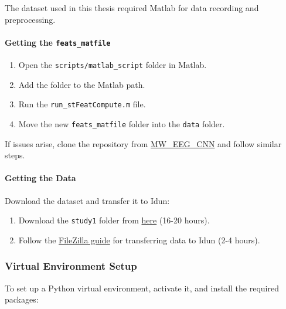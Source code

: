 The dataset used in this thesis required Matlab for data recording and preprocessing.

\paragraph{Getting the \texttt{feats\_matfile}}

\begin{enumerate}
    \item Open the \texttt{scripts/matlab\_script} folder in Matlab.
    \item Add the folder to the Matlab path.
    \item Run the \texttt{run\_stFeatCompute.m} file.
    \item Move the new \texttt{feats\_matfile} folder into the \texttt{data} folder.
\end{enumerate}

If issues arise, clone the repository from \href{https://github.com/christina109/MW_EEG_CNN.git}{MW\_EEG\_CNN} and follow similar steps.

\paragraph{Getting the Data}

Download the dataset and transfer it to Idun:

\begin{enumerate}
    \item Download the \texttt{study1} folder from \href{https://unishare.nl/index.php/s/T94LXPQqw5FEA4J?path=%2F}{here} (16-20 hours).
    \item Follow the \href{https://www.hpc.ntnu.no/idun/documentation/transferring-data/}{FileZilla guide} for transferring data to Idun (2-4 hours).
\end{enumerate}

\subsubsection{Virtual Environment Setup}

To set up a Python virtual environment, activate it, and install the required packages:

